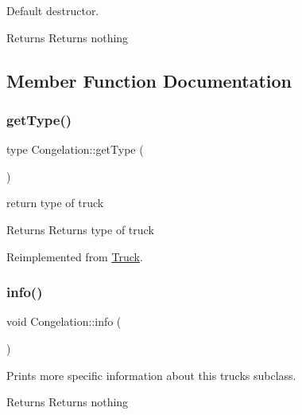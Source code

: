 Default destructor. 

\begin{DoxyReturn}{Returns}
Returns nothing 
\end{DoxyReturn}


\subsection{Member Function Documentation}
\mbox{\label{class_congelation_a5026bd6791faeae03fbf1ad84f9bbc08}} 
\subsubsection{\texorpdfstring{get\+Type()}{getType()}}
{\footnotesize\ttfamily type Congelation\+::get\+Type (\begin{DoxyParamCaption}{ }\end{DoxyParamCaption})\hspace{0.3cm}{\ttfamily [virtual]}}



return type of truck 

\begin{DoxyReturn}{Returns}
Returns type of truck 
\end{DoxyReturn}


Reimplemented from \hyperlink{class_truck_a24406caf4d09be7f3eff069ce6bc015b}{Truck}.

\mbox{\label{class_congelation_ac2f7cb9aeeeb9428a9a973e6a2c63942}} 
\subsubsection{\texorpdfstring{info()}{info()}}
{\footnotesize\ttfamily void Congelation\+::info (\begin{DoxyParamCaption}{ }\end{DoxyParamCaption})\hspace{0.3cm}{\ttfamily [virtual]}}



Prints more specific information about this truck\textquotesingle{}s subclass. 

\begin{DoxyReturn}{Returns}
Returns nothing 
\end{DoxyReturn}


